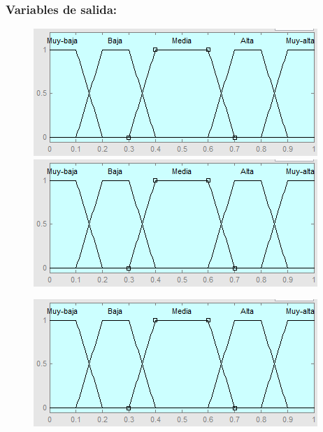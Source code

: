 \subsubsection{Variables de salida:}


\begin{figure}[H]
	\centering
	\begin{minipage}{.5\textwidth}
		\centering
		\includegraphics[scale=0.67]{images/variables/salida.png}
	\end{minipage}%
	\begin{minipage}{.5\textwidth}
		\centering
		\includegraphics[scale=0.67]{images/variables/salida.png}
	\end{minipage}
\end{figure}

\begin{figure}[H]
	\centering
	\begin{minipage}{.5\textwidth}
		\centering
		\includegraphics[scale=0.67]{images/variables/salida.png}
	\end{minipage}
\end{figure}

